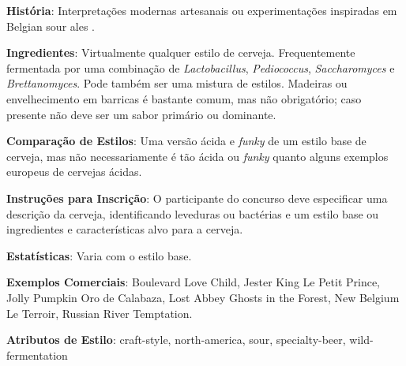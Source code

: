 \textbf{História}: Interpretações modernas artesanais ou experimentações inspiradas em Belgian sour ales .

\textbf{Ingredientes}: Virtualmente qualquer estilo de cerveja. Frequentemente fermentada por uma combinação de \textit{Lactobacillus}, \textit{Pediococcus}, \textit{Saccharomyces} e \textit{Brettanomyces}. Pode também ser uma mistura de estilos. Madeiras ou envelhecimento em barricas é bastante comum, mas não obrigatório; caso presente não deve ser um sabor primário ou dominante.

\textbf{Comparação de Estilos}: Uma versão ácida e \textit{funky} de um estilo base de cerveja, mas não necessariamente é tão ácida ou \textit{funky} quanto alguns exemplos europeus de cervejas ácidas.

\textbf{Instruções para Inscrição}: O participante do concurso deve especificar uma descrição da cerveja, identificando leveduras ou bactérias e um estilo base ou ingredientes e características alvo para a cerveja.

\textbf{Estatísticas}: Varia com o estilo base.

\textbf{Exemplos Comerciais}: Boulevard Love Child, Jester King Le Petit Prince, Jolly Pumpkin Oro de Calabaza, Lost Abbey Ghosts in the Forest, New Belgium Le Terroir, Russian River Temptation.

\textbf{Atributos de Estilo}: craft-style, north-america, sour, specialty-beer, wild-fermentation
